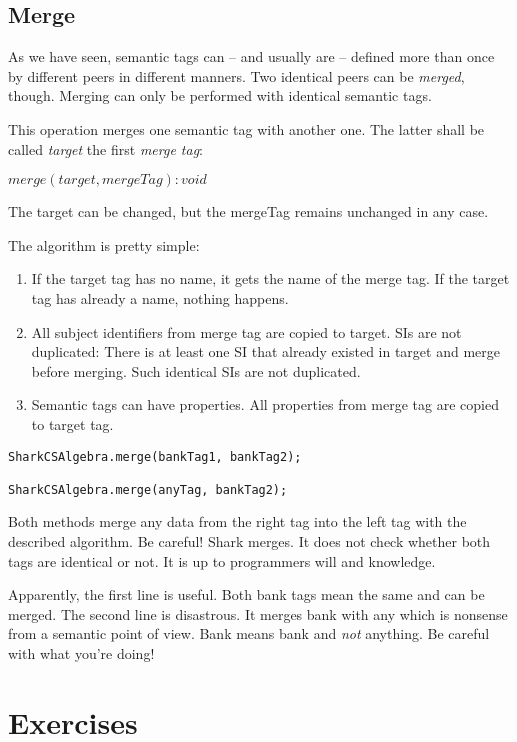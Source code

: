 \subsection{Merge}
As we have seen, semantic tags can -- and usually are -- defined more than once by different peers in different manners. Two identical peers can be {\it merged}, though. Merging can only be performed with identical semantic tags.

This operation merges one semantic tag with another one. The latter shall be called {\it target} the first {\it merge tag}:  

$merge(target, mergeTag): void$

The target can be changed, but the mergeTag remains unchanged in any case.

The algorithm is pretty simple:

\begin{enumerate}
\item 
If the target tag has no name, it gets the name of the merge tag. If the target tag has already a name, nothing happens.

\item
All subject identifiers from merge tag are copied to target. SIs are not duplicated: There is at least one SI that already existed in target and merge before merging. Such identical SIs are not duplicated.

\item
Semantic tags can have properties. All properties from merge tag are copied to target tag.
\end{enumerate}

\begin{verbatim}
SharkCSAlgebra.merge(bankTag1, bankTag2);

SharkCSAlgebra.merge(anyTag, bankTag2);
\end{verbatim}

Both methods merge any data from the right tag into the left tag with the described algorithm. Be careful! Shark merges. It does not check whether both tags are identical or not. It is up to programmers will and knowledge. 

Apparently, the first line is useful. Both bank tags mean the same and can be merged. The second line is disastrous. It merges bank with any which is nonsense from a semantic point of view. Bank means bank and {\it not} anything. Be careful with what you're doing!

\section{Exercises}

